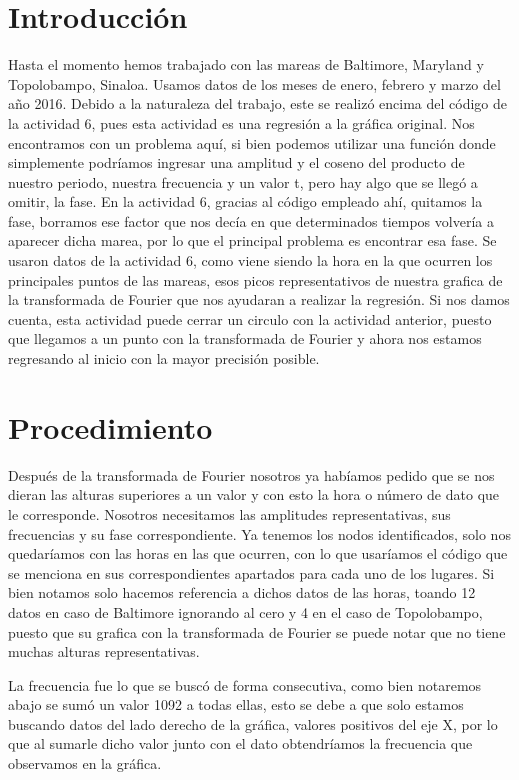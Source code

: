\documentclass[a4paper,12pt]{article}
\begin{document}
\section{Introducción}
\noindent
Hasta el momento hemos trabajado con las mareas de Baltimore, Maryland y Topolobampo, Sinaloa. Usamos datos de los meses de enero, febrero y marzo del año 2016. Debido a la naturaleza del trabajo, este se realizó encima del código de la actividad 6, pues esta actividad es una regresión a la gráfica original. Nos encontramos con un problema aquí, si bien podemos utilizar una función donde simplemente podríamos ingresar una amplitud y el coseno del producto de nuestro periodo, nuestra frecuencia y un valor t, pero hay algo que se llegó a omitir, la fase. En la actividad 6, gracias al código empleado ahí, quitamos la fase, borramos ese factor que nos decía en que determinados tiempos volvería a aparecer dicha marea, por lo que el principal problema es encontrar esa fase. Se usaron datos de la actividad 6, como viene siendo la hora en la que ocurren los principales puntos de las mareas, esos picos representativos de nuestra grafica de la transformada de Fourier que nos ayudaran a realizar la regresión. Si nos damos cuenta, esta actividad puede cerrar un circulo con la actividad anterior, puesto que llegamos a un punto con la transformada de Fourier y ahora nos estamos regresando al inicio con la mayor precisión posible.
\section{Procedimiento}
\noindent
Después de la transformada de Fourier nosotros ya habíamos pedido que se nos dieran las alturas superiores a un valor y con esto la hora o número de dato que le corresponde. Nosotros necesitamos las amplitudes representativas, sus frecuencias y su fase correspondiente. Ya tenemos los nodos identificados, solo nos quedaríamos con las horas en las que ocurren, con lo que usaríamos el código que se menciona en sus correspondientes apartados para cada uno de los lugares. Si bien notamos solo hacemos referencia a dichos datos de las horas, toando 12 datos en caso de Baltimore ignorando al cero y 4 en el caso de Topolobampo, puesto que su grafica con la transformada de Fourier se puede notar que no tiene muchas alturas representativas. 

La frecuencia fue lo que se buscó de forma consecutiva, como bien notaremos abajo se sumó un valor 1092 a todas ellas, esto se debe a que solo estamos buscando datos del lado derecho de la gráfica, valores positivos del eje X, por lo que al sumarle dicho valor junto con el dato obtendríamos la frecuencia que observamos en la gráfica.
\end{document}
